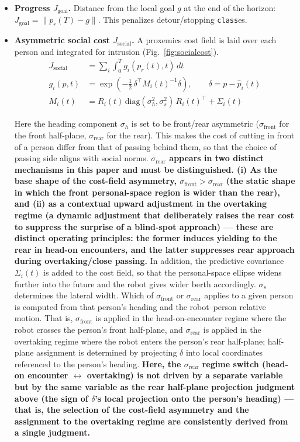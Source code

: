 \documentclass[11pt]{article}
\newcommand{\Class}{\texttt{class}}
\begin{document}
\begin{itemize}
\item \textbf{Progress $J_{\text{goal}}$.} Distance from the local goal $g$ at the end of the horizon: $J_{\text{goal}} = \lVert p_r(T) - g \rVert$. This penalizes detour/stopping \Class{es}.
\item \textbf{Asymmetric social cost $J_{\text{social}}$.} A proxemics cost field is laid over each person and integrated for intrusion (Fig.~\ref{fig:socialcost}).
\begin{align}
J_{\text{social}} &= \sum_i \int_0^T g_i(p_r(t), t)\, dt \\
g_i(p,t) &= \exp\!\left(-\tfrac{1}{2}\, \delta^\top M_i(t)^{-1} \delta\right), \qquad \delta = p - \hat p_i(t) \\
M_i(t) &= R_i(t)\, \mathrm{diag}(\sigma_h^2, \sigma_s^2)\, R_i(t)^\top + \Sigma_i(t)
\end{align}

Here the heading component $\sigma_h$ is set to be front/rear asymmetric ($\sigma_{\text{front}}$ for the front half-plane, $\sigma_{\text{rear}}$ for the rear). This makes the cost of cutting in front of a person differ from that of passing behind them, so that the choice of passing side aligns with social norms. \textbf{$\sigma_{\text{rear}}$ appears in two distinct mechanisms in this paper and must be distinguished. (i) As the base shape of the cost-field asymmetry, $\sigma_{\text{front}} > \sigma_{\text{rear}}$ (the static shape in which the front personal-space region is wider than the rear), and (ii) as a contextual upward adjustment in the overtaking regime (a dynamic adjustment that deliberately raises the rear cost to suppress the surprise of a blind-spot approach) --- these are distinct operating principles: the former induces yielding to the rear in head-on encounters, and the latter suppresses rear approach during overtaking/close passing.} In addition, the predictive covariance $\Sigma_i(t)$ is added to the cost field, so that the personal-space ellipse widens further into the future and the robot gives wider berth accordingly. $\sigma_s$ determines the lateral width. Which of $\sigma_{\text{front}}$ or $\sigma_{\text{rear}}$ applies to a given person is computed from that person's heading and the robot--person relative motion. That is, $\sigma_{\text{front}}$ is applied in the head-on-encounter regime where the robot crosses the person's front half-plane, and $\sigma_{\text{rear}}$ is applied in the overtaking regime where the robot enters the person's rear half-plane; half-plane assignment is determined by projecting $\delta$ into local coordinates referenced to the person's heading. \textbf{Here, the $\sigma_{\text{rear}}$ regime switch (head-on encounter $\leftrightarrow$ overtaking) is not driven by a separate variable but by the same variable as the rear half-plane projection judgment above (the sign of $\delta$'s local projection onto the person's heading) --- that is, the selection of the cost-field asymmetry and the assignment to the overtaking regime are consistently derived from a single judgment.}


\end{itemize}
\end{document}
